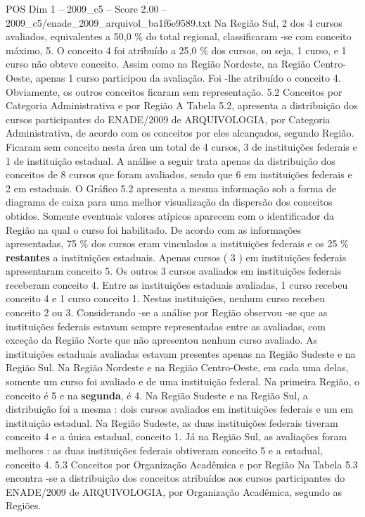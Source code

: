 \begin{textsample}{POS Dim 1 – 2009\_c5 – Score 2.00 – 2009\_c5/enade\_2009\_arquivol\_ba1f6e9589.txt}
Na Região Sul, 2 dos 4 cursos avaliados, equivalentes a 50,0 \% do total regional, classificaram -se com conceito máximo, 5.
O conceito 4 foi atribuído a 25,0 \% dos cursos, ou seja, 1 curso, e 1 curso não obteve conceito.
Assim como na Região Nordeste, na Região Centro-Oeste, apenas 1 curso participou da avaliação.
Foi -lhe atribuído o conceito 4.
Obviamente, os outros conceitos ficaram sem representação. 5.2 Conceitos por Categoria Administrativa e por Região A Tabela 5.2, apresenta a distribuição dos cursos participantes do ENADE/2009 de ARQUIVOLOGIA, por Categoria Administrativa, de acordo com os conceitos por eles alcançados, segundo Região.
Ficaram sem conceito nesta área um total de 4 cursos, 3 de instituições federais e 1 de instituição estadual.
A análise a seguir trata apenas da distribuição dos conceitos de 8 cursos que foram avaliados, sendo que 6 em instituições federais e 2 em estaduais.
O Gráfico 5.2 apresenta a mesma informação sob a forma de diagrama de caixa para uma melhor visualização da dispersão dos conceitos obtidos.
Somente eventuais valores atípicos aparecem com o identificador da Região na qual o curso foi habilitado.
De acordo com as informações apresentadas, 75 \% dos cursos eram vinculados a instituições federais e os 25 \% \textbf{restantes} a instituições estaduais.
Apenas cursos ( 3 ) em instituições federais apresentaram conceito 5.
Os outros 3 cursos avaliados em instituições federais receberam conceito 4.
Entre as instituições estaduais avaliadas, 1 curso recebeu conceito 4 e 1 curso conceito 1.
Nestas instituições, nenhum curso recebeu conceito 2 ou 3.
Considerando -se a análise por Região observou -se que as instituições federais estavam sempre representadas entre as avaliadas, com exceção da Região Norte que não apresentou nenhum curso avaliado.
As instituições estaduais avaliadas estavam presentes apenas na Região Sudeste e na Região Sul.
Na Região Nordeste e na Região Centro-Oeste, em cada uma delas, somente um curso foi avaliado e de uma instituição federal.
Na primeira Região, o conceito é 5 e na \textbf{segunda}, é 4.
Na Região Sudeste e na Região Sul, a distribuição foi a mesma : dois cursos avaliados em instituições federais e um em instituição estadual.
Na Região Sudeste, as duas instituições federais tiveram conceito 4 e a única estadual, conceito 1.
Já na Região Sul, as avaliações foram melhores : as duas instituições federais obtiveram conceito 5 e a estadual, conceito 4. 5.3 Conceitos por Organização Acadêmica e por Região Na Tabela 5.3 encontra -se a distribuição dos conceitos atribuídos aos cursos participantes do ENADE/2009 de ARQUIVOLOGIA, por Organização Acadêmica, segundo as Regiões.

\end{textsample}
